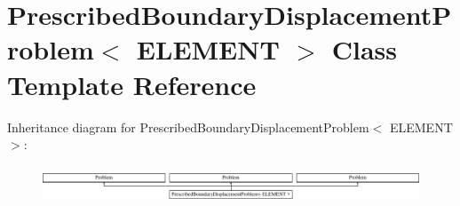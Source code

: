 \hypertarget{classPrescribedBoundaryDisplacementProblem}{}\section{Prescribed\+Boundary\+Displacement\+Problem$<$ E\+L\+E\+M\+E\+NT $>$ Class Template Reference}
\label{classPrescribedBoundaryDisplacementProblem}
Inheritance diagram for Prescribed\+Boundary\+Displacement\+Problem$<$ E\+L\+E\+M\+E\+NT $>$\+:\begin{figure}[H]
\begin{center}
\leavevmode
\includegraphics[height=1.098039cm]{classPrescribedBoundaryDisplacementProblem}
\end{center}
\end{figure}
